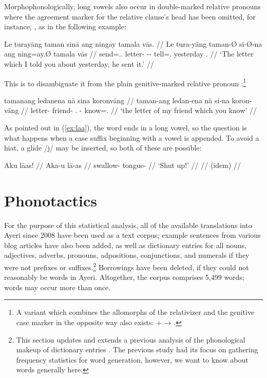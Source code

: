 Morphophonologically, long vowels also occur in double-marked relative pronouns 
where the agreement marker for the relative clause's head has been omitted,
for instance, , as in the following 
example:

\ex\begingl
	\gla Le turayāng taman sinā ang ningay tamala vās. //
	\glb Le tura-yāng taman-Ø si-Ø-na ang ning=ay.Ø tamala vās //
	\glc \PatTI{} send=\Tsg{}.\M{}.\Aarg{} letter-\Top{} \Rel{}-\PatTI{}-\Gen{} \AgtT{} tell=\Fsg{}.\Top{} yesterday \Ssg{}.\Parg{} //
	\glft `The letter which I told you about yesterday, he sent it.' //
\endgl\xe

This is to disambiguate it from the plain genitive-marked relative pronoun 
:\footnote{A variant which combines the 
allomorphs of the relativizer and the genitive case marker in the opposite way 
also exists:  +  → .}

\ex\begingl
	\gla tamanang ledanena nā sina koronvāng //
	\glb taman-ang ledan-ena nā si-na koron-vāng //
	\glc letter-\Aarg{} friend-\Gen{} \Fsg.\Gen{} \Rel{}-\Gen{} know=\Ssg{}.\Aarg{} //
	\glft `the letter of my friend which you know' //
\endgl\xe

As pointed out in (\ref{ex:laa}), the word  ends in a 
long vowel, so the question is what happens when a case suffix beginning with a 
vowel is appended. To avoid a hiat, a glide /j/ may be inserted, so both of 
these are possible:

\pex
	\a\begingl
		\gla Aku lāas! //
		\glb Aka-u lā-as //
		\glc swallow-\Imp{} tongue-\Parg{} //
		\glft `Shut up!' //
	\endgl
	\a\begingl
		 //
		\glb (idem) //
	\endgl
\xe

\section{Phonotactics}

For the purpose of this statistical analysis, all of the available translations 
into Ayeri since 2008 have been used as a text corpus; example sentences from 
various blog articles have also been added, as well as dictionary entries for 
all nouns, adjectives, adverbs, pronouns, adpositions, conjunctions, and 
numerals if they were not prefixes or suffixes.\footnote{This section updates 
and extends a previous analysis of the phonological makeup of dictionary entries 
\autocite{becker:frequency}. The previous study had its focus on gathering 
frequency statistics for word generation, however, we want to know about words 
generally here.} Borrowings have been deleted, if they could not reasonably be 
words in Ayeri. Altogether, the corpus comprises 5,499 words; words may occur 
more than once.

